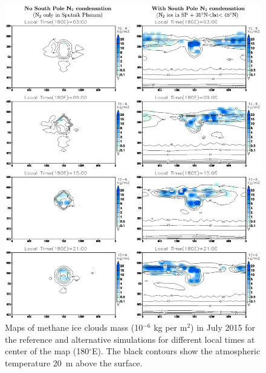 \begin{figure}
  \begin{center}
    \includegraphics[width=17.cm,angle=-0,clip]{figures/fig_mapcloud.eps}
    \caption{
\label{fg:map_clouds} 
Maps of methane ice clouds mass (10$^{-6}$ kg per m$^2$) in July 2015 for the reference and
alternative simulations for different local times at center of the map (180$^\circ$E).
The black contours show the atmospheric temperature 20~m above the surface.
}
  \end{center}
\end{figure}

